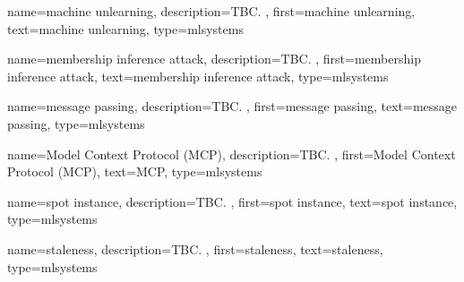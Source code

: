 {name={machine unlearning},
	description={TBC. },
	first={machine unlearning},
	text={machine unlearning},
	type=mlsystems
}

{name={membership inference attack}, 
	description={TBC. }, 
 	first={membership inference attack}, 
 	text={membership inference attack},
	type=mlsystems
}

{name={message passing},
	description={TBC. },
	first={message passing},
	text={message passing},
	type=mlsystems
}

{name={Model Context Protocol (MCP)},
	description={TBC. },
	first={Model Context Protocol (MCP)},
	text={MCP},
	type=mlsystems
}

{name={spot instance},
	description={TBC. }, 
	first={spot instance},
	text={spot instance},
	type=mlsystems
}

{name={staleness},
	description={TBC. },
	first={staleness},
	text={staleness},
	type=mlsystems
}










